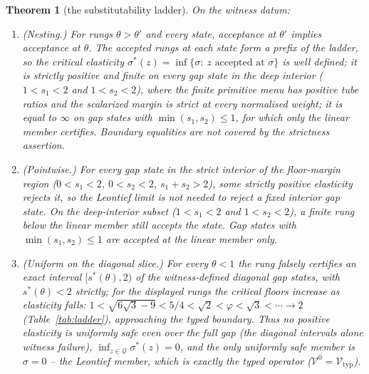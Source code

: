 \documentclass[preprint,11pt,authoryear]{elsarticle}
\newtheorem{theorem}{Theorem}
\theoremstyle{definition}
\theoremstyle{remark}
\newcommand{\Vtyp}{\mathcal{V}_{\mathrm{typ}}}
\newcommand{\Q}{\mathcal{Q}}
\begin{document}
\begin{theorem}[the substitutability ladder]\label{thm:ladder}
On the witness datum:
\begin{enumerate}[label=\textup{(\roman*)},leftmargin=2em]
\item \textup{(Nesting.)} For rungs $\theta>\theta'$ and every state, acceptance at $\theta'$ implies acceptance at $\theta$. The accepted rungs at each state form a prefix of the ladder, so the \emph{critical elasticity} $\sigma^*(z)=\inf\{\sigma:\ z\text{ accepted at }\sigma\}$ is well defined; it is strictly positive and finite on every gap state in the deep interior ($1<s_1<2$ and $1<s_2<2$), where the finite primitive menu has positive tube ratios and the scalarized margin is strict at every normalised weight; it is equal to $\infty$ on gap states with $\min(s_1,s_2)\le1$, for which only the linear member certifies. Boundary equalities are not covered by the strictness assertion.
\item \textup{(Pointwise.)} For every gap state in the strict interior of the floor-margin region ($0<s_1<2$, $0<s_2<2$, $s_1+s_2>2$), some strictly positive elasticity rejects it, so the Leontief limit is not needed to reject a fixed interior gap state. On the deep-interior subset ($1<s_1<2$ and $1<s_2<2$), a finite rung below the linear member still accepts the state. Gap states with $\min(s_1,s_2)\le1$ are accepted at the linear member only.
\item \textup{(Uniform on the diagonal slice.)} For every $\theta<1$ the rung falsely certifies an exact interval $[s^*(\theta),2)$ of the witness-defined diagonal gap states, with $s^*(\theta)<2$ strictly; for the displayed rungs the critical floors increase as elasticity falls: $1<\sqrt{6\sqrt3-9}<5/4<\sqrt2<\varphi<\sqrt3<\cdots\to2$ (Table~\ref{tab:ladder}), approaching the typed boundary. Thus no positive elasticity is uniformly safe even over the full gap (the diagonal intervals alone witness failure), $\inf_{z\in\Q}\sigma^*(z)=0$, and the only uniformly safe member is $\sigma=0$ -- the Leontief member, which is exactly the typed operator ($\mathcal V^{0}=\Vtyp$).
\end{enumerate}
\end{theorem}
\end{document}

